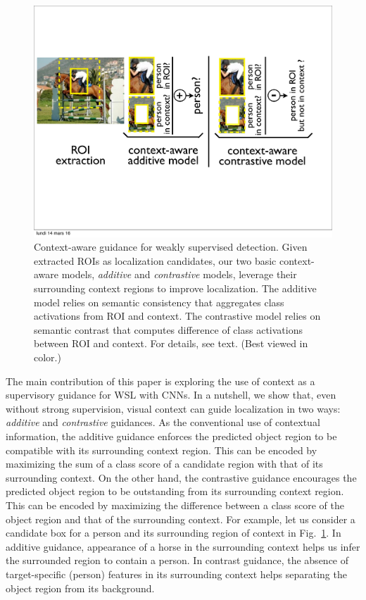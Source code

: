 \begin{figure}[t] 
\includegraphics[width=\textwidth, trim={2mm 6.0cm 2mm 3cm},
clip]{images/overview} 
\vspace{-6ex} 
\caption[small]{Context-aware guidance for weakly supervised detection.
Given extracted ROIs as localization candidates, our two basic context-aware models, {\em additive} and {\em contrastive} models, leverage their surrounding context regions to improve localization. The additive model relies on semantic consistency that aggregates  class activations from ROI and context. The contrastive model relies on semantic contrast that computes  difference of class activations between ROI and context. For details, see text. (Best viewed in color.)} 
\label{fig:intro} 
\end{figure}

The main contribution of this paper is exploring the use of context as a
supervisory guidance for WSL with CNNs. In a nutshell, we show that, even without strong
supervision, visual context can guide localization in two ways: {\it additive
} and {\it contrastive} guidances.  As the conventional use of contextual
information, the additive guidance enforces the predicted object region to be
compatible with its surrounding context region. This can be encoded by
maximizing the sum of a class score of a candidate region with that of its
surrounding context.
On the other hand, the contrastive guidance encourages the
predicted object region to be outstanding from its surrounding context region.
This can be encoded by maximizing the difference between a class score of the
object region and that of the surrounding context. %
For example, let us consider a candidate box for a person and its surrounding
region of context in Fig.~\ref{fig:intro}. In additive guidance,
appearance of a horse in the surrounding context helps us infer the
surrounded region to contain a person. In contrast guidance, the absence of
target-specific (person) features in its surrounding context helps 
separating the object region from its background.

